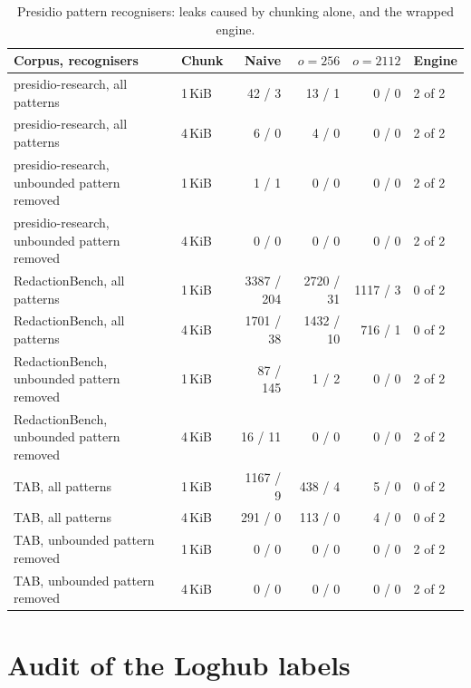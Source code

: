 \documentclass[11pt,a4paper]{article}
\begin{document}
\begin{table}[ht]
\caption{Presidio pattern recognisers: leaks caused by chunking alone, and the wrapped engine.}\label{t:wrap}
\small
\setlength{\tabcolsep}{3pt}
\begin{tabular*}{\textwidth}{@{\extracolsep\fill}llrrrl}
\toprule
Corpus, recognisers & Chunk & Naive & $o = 256$ & $o = 2112$ & Engine \\
\midrule
presidio-research, all patterns & 1\,KiB & 42 / 3 & 13 / 1 & 0 / 0 & 2 of 2 \\
presidio-research, all patterns & 4\,KiB & 6 / 0 & 4 / 0 & 0 / 0 & 2 of 2 \\
presidio-research, unbounded pattern removed & 1\,KiB & 1 / 1 & 0 / 0 & 0 / 0 & 2 of 2 \\
presidio-research, unbounded pattern removed & 4\,KiB & 0 / 0 & 0 / 0 & 0 / 0 & 2 of 2 \\
RedactionBench, all patterns & 1\,KiB & 3387 / 204 & 2720 / 31 & 1117 / 3 & 0 of 2 \\
RedactionBench, all patterns & 4\,KiB & 1701 / 38 & 1432 / 10 & 716 / 1 & 0 of 2 \\
RedactionBench, unbounded pattern removed & 1\,KiB & 87 / 145 & 1 / 2 & 0 / 0 & 2 of 2 \\
RedactionBench, unbounded pattern removed & 4\,KiB & 16 / 11 & 0 / 0 & 0 / 0 & 2 of 2 \\
TAB, all patterns & 1\,KiB & 1167 / 9 & 438 / 4 & 5 / 0 & 0 of 2 \\
TAB, all patterns & 4\,KiB & 291 / 0 & 113 / 0 & 4 / 0 & 0 of 2 \\
TAB, unbounded pattern removed & 1\,KiB & 0 / 0 & 0 / 0 & 0 / 0 & 2 of 2 \\
TAB, unbounded pattern removed & 4\,KiB & 0 / 0 & 0 / 0 & 0 / 0 & 2 of 2 \\
\bottomrule
\end{tabular*}
\end{table}

\section{Audit of the Loghub labels}\label{s:audit}
\end{document}
